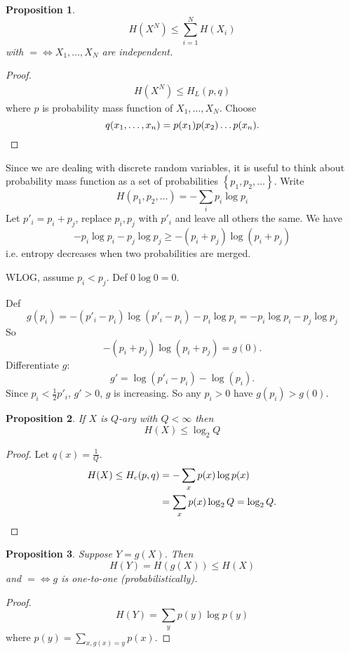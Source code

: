 \documentclass{report}
\newcommand{\set}[1]{\left\lbrace #1 \right\rbrace}
\newtheorem{proposition}{Proposition}[section]
\theoremstyle{definition}
\theoremstyle{remark}
\numberwithin{equation}{section}
\begin{document}
\begin{proposition}
  \[
    H(X^N) \leq \sum_{i=1}^N H(X_i)  
  \] with $= \iff X_1, \ldots, X_N$ are independent.  
\end{proposition}

\begin{proof}
  \begin{align*}
    H(X^N) \leq H_L(p, q)
  \end{align*}
  where $p$ is probability mass function of $X_1, \ldots, X_N$. Choose \[q(x_1, \ldots, x_n) = p(x_1)p(x_2)\ldots p(x_n). \qedhere\]
\end{proof}

Since we are dealing with discrete random variables, it is useful to think about probability mass function as a set of probabilities $\set{p_1, p_2, \ldots}$. Write \[H(p_1, p_2, \ldots) = -\sum_i p_i \log p_i\]
Let $p'_i = p_i + p_j$, replace $p_i, p_j$ with $p'_i$ and leave all others the same. We have \[
-p_i \log p_i - p_j \log p_j \geq -(p_i + p_j)\log (p_i + p_j) 
\] i.e. entropy decreases when two probabilities are merged.

WLOG, assume $p_i < p_j$. Def $0\log0 = 0$.

Def \[
  g(p_i) = -(p'_i - p_i)\log(p'_i - p_i) - p_i \log p_i = -p_i \log p_i - p_j \log p_j
\]
So \[
  -(p_i + p_j)\log (p_i + p_j) = g(0).
\]
Differentiate $g$:
\[
  g' = \log(p'_i - p_i) - \log(p_i)  .
\]
Since $p_i < \frac{1}{2} p'_i$, $g' > 0$, $g$ is increasing. So any $p_i > 0$ have $g(p_i) > g(0)$.


\begin{proposition}
  If $X$ is $Q$-ary with $Q < \infty$ then \[H(X) \leq \log_2 Q\]
\end{proposition}
\begin{proof}
  Let $q(x) = \frac{1}{Q}$.
  \begin{align*}
    H(X) \leq H_c(p, q) & = -\sum_x p(x) \log p(x) \\
    & = \sum_x p(x) \log_2 Q = \log_2 Q. \qedhere
  \end{align*}
\end{proof}

\begin{proposition}
  Suppose $Y = g(X)$. Then \[
    H(Y) = H(g(X)) \leq H(X)
  \] and $= \iff g$ is one-to-one (probabilistically).
\end{proposition}
\begin{proof}
  \[
   H(Y) = \sum_{y} p(y) \log p(y)
  \] where $p(y) = \sum_{x, g(x) = y} p(x)$.
\end{proof}
\end{document}
